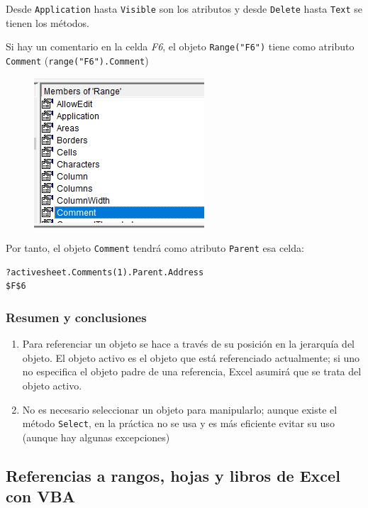 Desde \texttt{Application} hasta \texttt{Visible} son los atributos y desde \texttt{Delete} hasta \texttt{Text} se tienen los métodos.

Si hay un comentario en la celda \textit{F6}, el objeto \texttt{Range("F6")} tiene como atributo \texttt{Comment} (\texttt{range("F6").Comment}) 

\begin{figure}[H]
    \centering
    \includegraphics{ExcelMacro/rangeatr.png}
\end{figure}

Por tanto, el objeto \texttt{Comment} tendrá como atributo \texttt{Parent} esa celda:


\begin{verbatim}
?activesheet.Comments(1).Parent.Address
$F$6
\end{verbatim}

\subsubsection{Resumen y conclusiones}

\begin{enumerate}
    \item Para referenciar un objeto se hace a través de su posición en la jerarquía del objeto. El objeto activo es el objeto que está referenciado actualmente; si uno no especifica el objeto padre de una referencia, Excel asumirá que se trata del objeto activo.
    \item No es necesario seleccionar un objeto para manipularlo; aunque existe el método \texttt{Select}, en la práctica no se usa y es más eficiente evitar su uso (aunque hay algunas excepciones) 
\end{enumerate}


\subsection{Referencias a rangos, hojas y libros de Excel con VBA}

